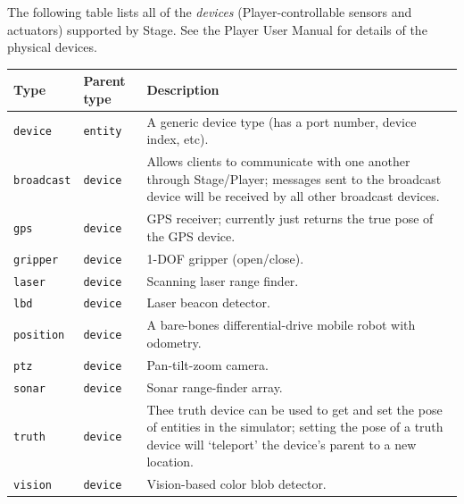 \documentclass[11pt,twoside]{report}
\begin{document}
The following table lists all of the {\em devices}
(Player-controllable sensors and actuators) supported by Stage.  See
the Player User Manual for details of the physical devices.
\vspace{1em}\\\noindent
\begin{tabularx}{\columnwidth}{llX}
\hline 
Type & Parent type & Description \\
\hline

\verb'device' & \verb'entity' & A generic device type (has a port
number, device index, etc). \\

\hline

\verb'broadcast' & \verb'device' & Allows clients to communicate with
one another through Stage/Player; messages sent to the broadcast
device will be received by all other broadcast devices.\\

\verb'gps' & \verb'device' & GPS receiver; currently just returns the
true pose of the GPS device.\\

\verb'gripper' & \verb'device' & 1-DOF gripper (open/close).\\

\verb'laser' & \verb'device' & Scanning laser range finder.\\

\verb'lbd' & \verb'device' & Laser beacon detector.\\

\verb'position' & \verb'device' & A bare-bones differential-drive
mobile robot with odometry.\\

\verb'ptz' & \verb'device' & Pan-tilt-zoom camera. \\

\verb'sonar' & \verb'device' & Sonar range-finder array.\\

\verb'truth' & \verb'device' & Thee truth device can be used to get
and set the pose of entities in the simulator; setting the pose of a
truth device will `teleport' the device's parent to a new location.\\

\verb'vision' & \verb'device' & Vision-based color blob detector.\\

\hline
\end{tabularx}
\vspace{1em}\\
\end{document}

